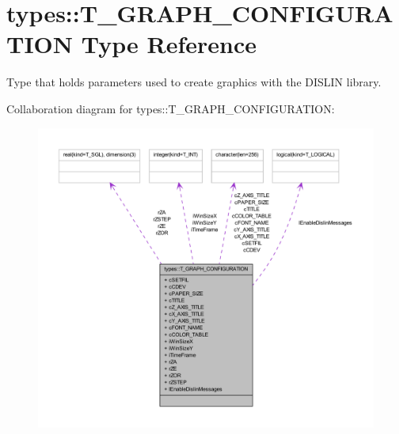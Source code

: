 \hypertarget{typetypes_1_1_t___g_r_a_p_h___c_o_n_f_i_g_u_r_a_t_i_o_n}{
\section{types::T\_\-GRAPH\_\-CONFIGURATION Type Reference}
\label{typetypes_1_1_t___g_r_a_p_h___c_o_n_f_i_g_u_r_a_t_i_o_n}
}


Type that holds parameters used to create graphics with the DISLIN library.  




Collaboration diagram for types::T\_\-GRAPH\_\-CONFIGURATION:\nopagebreak
\begin{figure}[H]
\begin{center}
\leavevmode
\includegraphics[width=400pt]{typetypes_1_1_t___g_r_a_p_h___c_o_n_f_i_g_u_r_a_t_i_o_n__coll__graph}
\end{center}
\end{figure}
